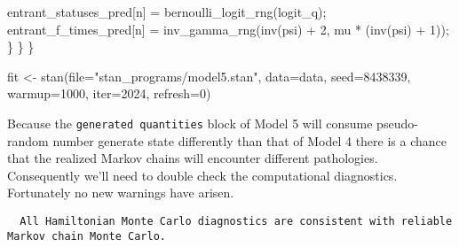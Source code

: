 \documentclass[
  letterpaper,
  DIV=11,
  numbers=noendperiod]{scrartcl}
\newenvironment{Shaded}{\begin{snugshade}}{\end{snugshade}}
\newcommand{\AttributeTok}[1]{\textcolor[rgb]{0.40,0.45,0.13}{#1}}
\newcommand{\DecValTok}[1]{\textcolor[rgb]{0.68,0.00,0.00}{#1}}
\newcommand{\FunctionTok}[1]{\textcolor[rgb]{0.28,0.35,0.67}{#1}}
\newcommand{\NormalTok}[1]{\textcolor[rgb]{0.00,0.23,0.31}{#1}}
\newcommand{\OtherTok}[1]{\textcolor[rgb]{0.00,0.23,0.31}{#1}}
\newcommand{\SpecialCharTok}[1]{\textcolor[rgb]{0.37,0.37,0.37}{#1}}
\newcommand{\StringTok}[1]{\textcolor[rgb]{0.13,0.47,0.30}{#1}}
\begin{document}
\begin{codelisting}
\begin{Shaded}
\begin{Highlighting}[]
\NormalTok{      entrant\_statuses\_pred[n] = bernoulli\_logit\_rng(logit\_q);}
\NormalTok{      entrant\_f\_times\_pred[n] = inv\_gamma\_rng(inv(psi) + }\DecValTok{2}\NormalTok{,}
\NormalTok{                                              mu * (inv(psi) + }\DecValTok{1}\NormalTok{));}
\NormalTok{    \}}
\NormalTok{  \}}
\NormalTok{\}}
\end{Highlighting}
\end{Shaded}

\end{codelisting}

\begin{Shaded}
\begin{Highlighting}[]
\NormalTok{fit }\OtherTok{\textless{}{-}} \FunctionTok{stan}\NormalTok{(}\AttributeTok{file=}\StringTok{"stan\_programs/model5.stan"}\NormalTok{,}
            \AttributeTok{data=}\NormalTok{data, }\AttributeTok{seed=}\DecValTok{8438339}\NormalTok{,}
            \AttributeTok{warmup=}\DecValTok{1000}\NormalTok{, }\AttributeTok{iter=}\DecValTok{2024}\NormalTok{, }\AttributeTok{refresh=}\DecValTok{0}\NormalTok{)}
\end{Highlighting}
\end{Shaded}

Because the \texttt{generated\ quantities} block of Model 5 will consume
pseudo-random number generate state differently than that of Model 4
there is a chance that the realized Markov chains will encounter
different pathologies. Consequently we'll need to double check the
computational diagnostics. Fortunately no new warnings have arisen.

\begin{Shaded}
\end{Shaded}

\begin{verbatim}
  All Hamiltonian Monte Carlo diagnostics are consistent with reliable
Markov chain Monte Carlo.
\end{verbatim}
\end{document}
